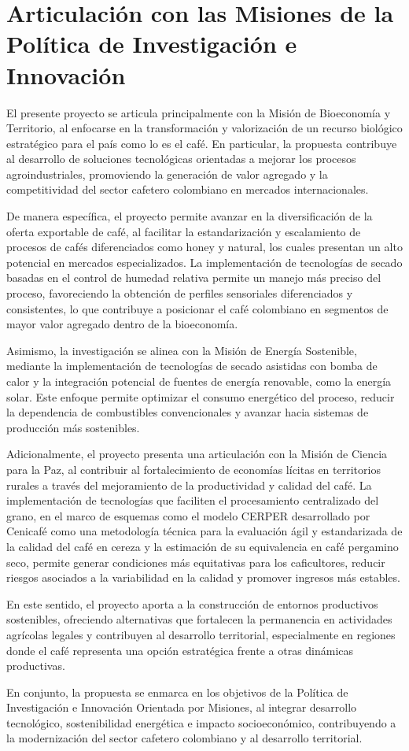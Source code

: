 \section{Articulación con las Misiones de la Política de Investigación e Innovación}

El presente proyecto se articula principalmente con la Misión de Bioeconomía y Territorio, al enfocarse en la transformación y valorización de un recurso biológico estratégico para el país como lo es el café. En particular, la propuesta contribuye al desarrollo de soluciones tecnológicas orientadas a mejorar los procesos agroindustriales, promoviendo la generación de valor agregado y la competitividad del sector cafetero colombiano en mercados internacionales.

De manera específica, el proyecto permite avanzar en la diversificación de la oferta exportable de café, al facilitar la estandarización y escalamiento de procesos de cafés diferenciados como honey y natural, los cuales presentan un alto potencial en mercados especializados. La implementación de tecnologías de secado basadas en el control de humedad relativa permite un manejo más preciso del proceso, favoreciendo la obtención de perfiles sensoriales diferenciados y consistentes, lo que contribuye a posicionar el café colombiano en segmentos de mayor valor agregado dentro de la bioeconomía.

Asimismo, la investigación se alinea con la Misión de Energía Sostenible, mediante la implementación de tecnologías de secado asistidas con bomba de calor y la integración potencial de fuentes de energía renovable, como la energía solar. Este enfoque permite optimizar el consumo energético del proceso, reducir la dependencia de combustibles convencionales y avanzar hacia sistemas de producción más sostenibles.

Adicionalmente, el proyecto presenta una articulación con la Misión de Ciencia para la Paz, al contribuir al fortalecimiento de economías lícitas en territorios rurales a través del mejoramiento de la productividad y calidad del café. La implementación de tecnologías que faciliten el procesamiento centralizado del grano, en el marco de esquemas como el modelo CERPER desarrollado por Cenicafé como una metodología técnica para la evaluación ágil y estandarizada de la calidad del café en cereza y la estimación de su equivalencia en café pergamino seco, permite generar condiciones más equitativas para los caficultores, reducir riesgos asociados a la variabilidad en la calidad y promover ingresos más estables.

En este sentido, el proyecto aporta a la construcción de entornos productivos sostenibles, ofreciendo alternativas que fortalecen la permanencia en actividades agrícolas legales y contribuyen al desarrollo territorial, especialmente en regiones donde el café representa una opción estratégica frente a otras dinámicas productivas.

En conjunto, la propuesta se enmarca en los objetivos de la Política de Investigación e Innovación Orientada por Misiones, al integrar desarrollo tecnológico, sostenibilidad energética e impacto socioeconómico, contribuyendo a la modernización del sector cafetero colombiano y al desarrollo territorial.